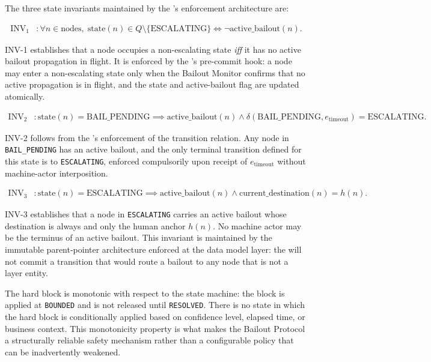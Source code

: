 The three state invariants maintained by the \fact's enforcement architecture are:

\begin{align}
\text{INV}_1 &: \forall n \in \text{nodes},\; \text{state}(n) \in Q \setminus \{\text{ESCALATING}\} \iff \neg\text{active\_bailout}(n). \tag{INV-1}
\end{align}

INV-1 establishes that a node occupies a non-escalating state \emph{iff} it has no active bailout propagation in flight. It is enforced by the \fact's pre-commit hook: a node may enter a non-escalating state only when the Bailout Monitor confirms that no active propagation is in flight, and the state and active-bailout flag are updated atomically.

\begin{align}
\text{INV}_2 &: \text{state}(n) = \text{BAIL\_PENDING} \implies \text{active\_bailout}(n) \land \delta(\text{BAIL\_PENDING}, e_{\text{timeout}}) = \text{ESCALATING}. \tag{INV-2}
\end{align}

INV-2 follows from the \fact's enforcement of the transition relation. Any node in \texttt{BAIL\_PENDING} has an active bailout, and the only terminal transition defined for this state is to \texttt{ESCALATING}, enforced compulsorily upon receipt of $e_{\text{timeout}}$ without machine-actor interposition.

\begin{align}
\text{INV}_3 &: \text{state}(n) = \text{ESCALATING} \implies \text{active\_bailout}(n) \land \text{current\_destination}(n) = h(n). \tag{INV-3}
\end{align}

INV-3 establishes that a node in \texttt{ESCALATING} carries an active bailout whose destination is always and only the human anchor $h(n)$. No machine actor may be the terminus of an active bailout. This invariant is maintained by the immutable parent-pointer architecture enforced at the data model layer: the \fact{} will not commit a transition that would route a bailout to any node that is not a \purpose{} layer entity.

The hard block is monotonic with respect to the state machine: the block is applied at \texttt{BOUNDED} and is not released until \texttt{RESOLVED}. There is no state in which the hard block is conditionally applied based on confidence level, elapsed time, or business context. This monotonicity property is what makes the Bailout Protocol a structurally reliable safety mechanism rather than a configurable policy that can be inadvertently weakened.

